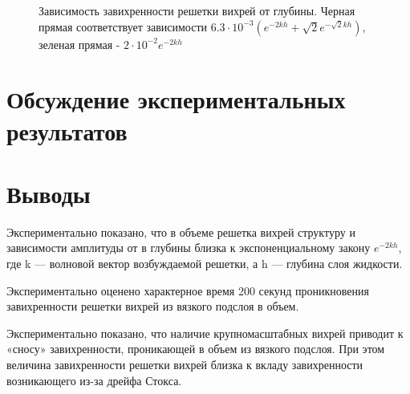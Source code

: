 \begin{figure}[ht]
  \caption{Зависимость завихренности решетки вихрей от глубины. Черная прямая соответствует зависимости $6.3 \cdot 10^{-3} (e^{-2kh}+\sqrt{2}e^{-\sqrt{2}kh})$, зеленая прямая - $2 \cdot 10^{-2} e^{-2kh}$}
  \label{img:depth}  
\end{figure}

\section{Обсуждение экспериментальных результатов} \label{sect6_4}
\section{Выводы} \label{sect6_5}
Экспериментально показано, что в объеме решетка вихрей структуру и зависимости амплитуды от в глубины близка к  экспоненциальному закону $e^{-2kh}$, где k — волновой вектор возбуждаемой решетки, а h — глубина слоя жидкости. 

Экспериментально оценено характерное время 200 секунд проникновения завихренности решетки вихрей из вязкого подслоя в объем.

Экспериментально показано, что наличие крупномасштабных вихрей приводит к «сносу» завихренности, проникающей в объем из вязкого подслоя. При этом величина завихренности решетки вихрей  близка к вкладу завихренности возникающего из-за дрейфа Стокса.
\clearpage